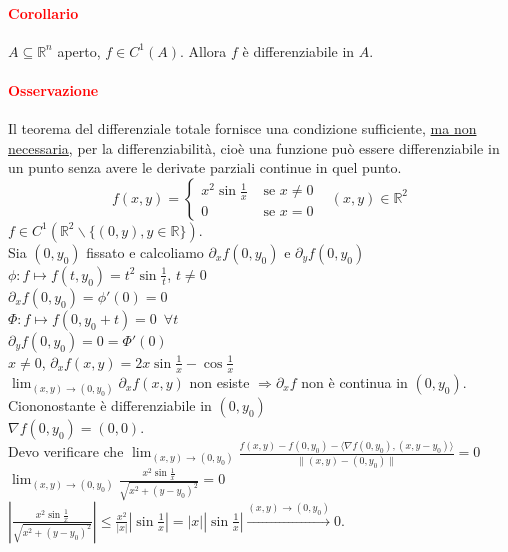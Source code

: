 \documentclass{article}
\newcommand{\R}{\mathbb{R}}
\begin{document}
\paragraph{\textcolor{red}{Corollario}}
$A\subseteq\R^n$ aperto, $f\in C^1(A)$. Allora $f$ è differenziabile in $A$.

\paragraph{\textcolor{red}{Osservazione}}
Il teorema del differenziale totale fornisce una condizione sufficiente, \underline{ma non necessaria}, per la differenziabilità, cioè una funzione può essere differenziabile in un punto senza avere le derivate parziali continue in quel punto.
\begin{equation*}
    f(x,y)=\begin{cases}
        x^2\sin\frac{1}{x}&\text{  se  }x\neq0\\
        0&\text{  se  }x=0
    \end{cases}
    \,\,\,\,\, (x,y)\in \R^2
\end{equation*}
$f\in C^1\left( \R^2\backslash\{(0,y),y\in\R\} \right)$.\\
Sia $(0,y_0)$ fissato e calcoliamo $\partial_x f(0,y_0)$ e $\partial_y f(0,y_0)$\\
$\phi: f \mapsto f(t,y_0)=t^2\sin\frac{1}{t}$, $t \neq 0$\\
$\partial_x f(0,y_0)=\phi'(0)=0$\\
$\Phi:f\mapsto f(0,y_0+t)=0\,\,\, \forall t$\\
$\partial_y f(0,y_0)=0=\Phi'(0)$\\
$x \neq 0$, $\partial_x f(x,y)=2x\sin\frac{1}{x}-\cos\frac{1}{x}$\\
$\lim_{(x,y)\rightarrow(0,y_0)}\partial_x f(x,y)$ non esiste $\Rightarrow \partial_xf$ non è continua in $(0,y_0)$. Ciononostante è differenziabile in $(0,y_0)$\\
$\nabla f(0,y_0)=(0,0)$.\\
Devo verificare che $\lim_{(x,y)\rightarrow(0,y_0)}\frac{f(x,y)-f(0,y_0)-\langle \nabla f(0,y_0),(x,y-y_0) \rangle}{\|(x,y)-(0,y_0)\|}=0$\\
$\lim_{(x,y)\rightarrow(0,y_0)}\frac{x^2\sin\frac{1}{x}}{\sqrt{x^2+(y-y_0)^2}}=0$\\
$|\frac{x^2\sin\frac{1}{x}}{\sqrt{x^2+(y-y_0)^2}}|\leq \frac{x^2}{|x|}|\sin\frac{1}{x}|=|x||\sin\frac{1}{x}|\xrightarrow{(x,y)\rightarrow(0,y_0)}0$.
\end{document}
